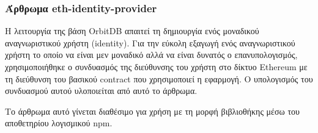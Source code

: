 \subsubsection{Άρθρωμα eth-identity-provider} \label{subsubsection:4-3-1-eth-identity-provider-unit}

Η λειτουργία της βάση OrbitDB απαιτεί τη δημιουργία ενός μοναδικού αναγνωριστικού χρήστη (identity). Για την εύκολη εξαγωγή ενός αναγνωριστικού χρήστη το οποίο να είναι μεν μοναδικό αλλά να είναι δυνατός ο επανυπολογισμός, χρησιμοποιήθηκε ο συνδυασμός της διεύθυνσης του χρήστη στο δίκτυο Ethereum με τη διεύθυνση του βασικού contract που χρησιμοποιεί η εφαρμογή. Ο υπολογισμός του συνδυασμού αυτού υλοποιείται από αυτό το άρθρωμα.

Το άρθρωμα αυτό γίνεται διαθέσιμο για χρήση με τη μορφή βιβλιοθήκης μέσω του αποθετηρίου λογισμικού npm.